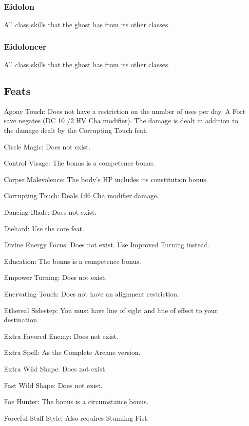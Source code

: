 \subsubsection{Eidolon}
 All class skills that the ghost has from its other classes.
\subsubsection{Eidoloncer}
 All class skills that the ghost has from its other classes.
\subsection{Feats}
\begin{itemize*}
\item Agony Touch: Does not have a restriction on the number of uses per day. A Fort save negates (DC 10 /2 HV \add Cha modifier). The damage is dealt in addition to the damage dealt by the Corrupting Touch feat.
\item Circle Magic: Does not exist.
\item Control Visage: The bonus is a competence bonus. 
\item Corpse Malevolence: The body's HP includes its constitution bonus.
\item Corrupting Touch: Deals 1d6 \add Cha modifier damage.
\item Dancing Blade: Does not exist.
\item Diehard: Use the core feat.
\item Divine Energy Focus: Does not exist. Use Improved Turning instead.
\item Education: The bonus is a competence bonus.
\item Empower Turning: Does not exist.
\item Enervating Touch: Does not have an alignment restriction.
\item Ethereal Sidestep: You must have line of sight and line of effect to your destination.
\item Extra Favored Enemy: Does not exist.
\item Extra Spell: As the Complete Arcane version.
\item Extra Wild Shape: Does not exist.
\item Fast Wild Shape: Does not exist.
\item Foe Hunter: The bonus is a circumstance bonus.
\item Forceful Staff Style: Also requires Stunning Fist.

\end{itemize*}
